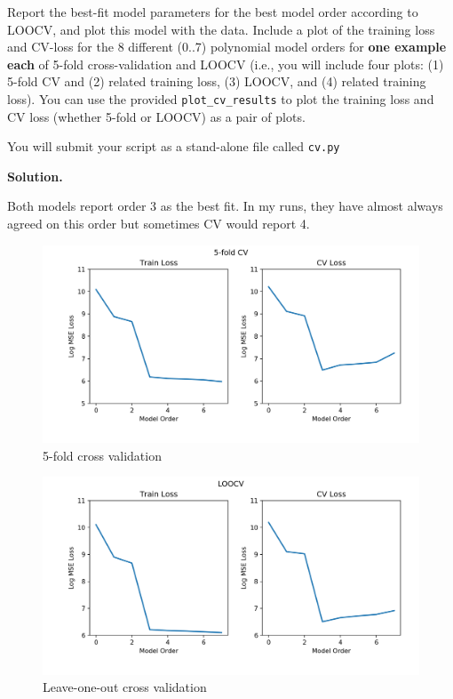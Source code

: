 \documentclass[10pt]{article}
\begin{document}
\begin{itemize}
Report the best-fit model parameters for the best model order according to LOOCV, and plot this model with the data.
Include a plot of the training loss and CV-loss for the 8 different (0..7) polynomial model orders for {\bf one example each} of 5-fold cross-validation and LOOCV (i.e., you will include four plots: (1) 5-fold CV and (2) related training loss, (3) LOOCV, and (4) related training loss).  You can use the provided {\tt plot\_cv\_results} to plot the training loss and CV loss (whether 5-fold or LOOCV) as a pair of plots.

You will submit your script as a stand-alone file called {\tt cv.py}

{\bf Solution.} 

Both models report order 3 as the best fit. In my runs, they have almost always agreed on this order but sometimes CV would report 4.

\begin{figure}[H]
\centering
  \includegraphics[width=\linewidth]{code/loss_5cv_o7_r1.png}
 \caption{5-fold cross validation}
\label{label}
\end{figure}

\begin{figure}[H]
\centering
  \includegraphics[width=\linewidth]{code/loss_loocv_o7_r1.png}
 \caption{Leave-one-out cross validation}
\label{label}
\end{figure}


\end{itemize}
\end{document}
